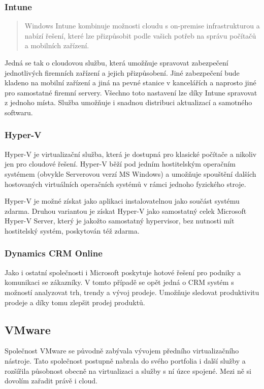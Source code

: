 \subsubsection{Intune}
\begin{quote}
Windows Intune kombinuje možnosti cloudu s on-premise infrastrukturou a nabízí řešení, které lze přizpůsobit podle vašich potřeb na správu počítačů a mobilních zařízení.\cite{ms:intune}
\end{quote}

Jedná se tak o cloudovou službu, která umožňuje spravovat zabezpečení jednotlivých firemních zařízení a jejich přizpůsobení. Jiné zabezpečení bude kladeno na mobilní zařízení a jiná na pevné stanice v kancelářích a naprosto jiné pro samostatné firemní servery. Všechno toto nastavení lze díky Intune spravovat z jednoho místa. Služba umožňuje i snadnou distribuci aktualizací a samotného softwaru.

\subsubsection{Hyper-V}
Hyper-V je virtualizační služba, která je dostupná pro klasické počítače a nikoliv jen pro cloudové řešení. Hyper-V běží pod jedním hostitelským operačním systémem (obvykle Serverovou verzí MS Windows) a umožňuje spouštění dalších hostovaných virtuálních operačních systémů v rámci jednoho fyzického stroje.

Hyper-V je možné získat jako aplikaci instalovatelnou jako součást systému zdarma. Druhou variantou je získat Hyper-V jako samostatný celek Microsoft Hyper-V Server, který je jakožto samostatný hypervisor, bez nutnosti mít hostitelský systém, poskytován též zdarma.

\subsubsection{Dynamics CRM Online}
Jako i ostatní společnosti i Microsoft poskytuje hotové řešení pro podniky a komunikaci se zákazníky. V tomto případě se opět jedná o CRM systém s možností analyzovat trh, trendy a vývoj prodeje. Umožňuje sledovat produktivitu prodeje a díky tomu zlepšit prodej produktů.

\subsection{VMware}
Společnost VMware se původně zabývala vývojem předního virtualizačního nástroje. Tato společnost postupně nabrala do svého portfolia i další služby a rozšířila působnost obecně na virtualizaci a služby s ní úzce spojené. Mezi ně si dovolím zařadit právě i cloud.

